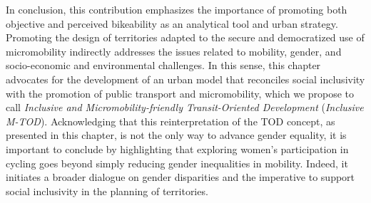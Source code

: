\begin{refsegment}
In conclusion, this contribution emphasizes the importance of promoting both objective and perceived bikeability as an analytical tool and urban strategy. Promoting the design of territories adapted to the secure and democratized use of micromobility indirectly addresses the issues related to mobility, gender, and socio-economic and environmental challenges. In this sense, this chapter advocates for the development of an urban model that reconciles social inclusivity with the promotion of public transport and micromobility, which we propose to call \textsl{Inclusive and Micromobility-friendly Transit-Oriented Development} (\textsl{Inclusive \acrshort{M-TOD}}). Acknowledging that this reinterpretation of the \acrshort{TOD} concept, as presented in this chapter, is not the only way to advance gender equality, it is important to conclude by highlighting that exploring women's participation in cycling goes beyond simply reducing gender inequalities in mobility. Indeed, it initiates a broader dialogue on gender disparities \textcolor{blue}{\autocite{sammito_closing_2023}} and the imperative to support social inclusivity in the planning of territories.%

     \newpage
     

\end{refsegment}
